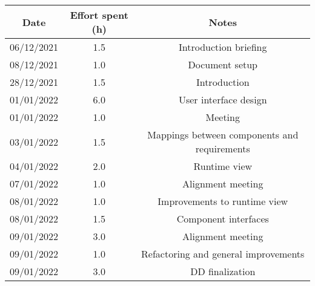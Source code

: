 \documentclass[../../main.tex]{subfiles}
\begin{document}
\begin{center}
    \begin{tabular}{|c| |c| |c|} 
        \hline
        Date & Effort spent (h) & Notes\\ [0.5ex] 
        \hline\hline
        06/12/2021 & 1.5 & Introduction briefing\\ 
        08/12/2021 & 1.0 & Document setup\\
        28/12/2021 & 1.5 & Introduction\\
        01/01/2022 & 6.0 & User interface design\\
        01/01/2022 & 1.0 & Meeting\\
        03/01/2022 & 1.5 & Mappings between components and requirements\\
        04/01/2022 & 2.0 & Runtime view\\
        07/01/2022 & 1.0 & Alignment meeting\\
        08/01/2022 & 1.0 & Improvements to runtime view\\
        08/01/2022 & 1.5 & Component interfaces\\
        09/01/2022 & 3.0 & Alignment meeting\\
        09/01/2022 & 1.0 & Refactoring and general improvements\\
        09/01/2022 & 3.0 & DD finalization\\
        \hline
    \end{tabular}
\end{center}
\end{document}
